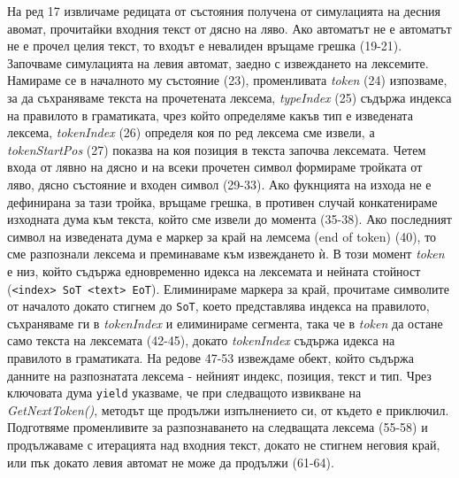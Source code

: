 \documentclass[12pt, oneside]{article}
\theoremstyle{definition}
\begin{document}
На ред 17 извличаме редицата от състояния получена от симулацията на десния авомат, прочитайки входния текст от дясно на ляво. Ако автоматът не е автоматът не е прочел целия текст, то входът е невалиден връщаме грешка (19-21). Започваме симулацията на левия автомат, заедно с извеждането на лексемите. Намираме се в началното му състояние (23), променливата \emph{token} (24) изпозваме, за да съхраняваме текста на прочетената лексема, \emph{typeIndex} (25) съдържа индекса на правилото в граматиката, чрез който определяме какъв тип е изведената лексема, \emph{tokenIndex} (26) определя коя по ред лексема сме извели, а \emph{tokenStartPos} (27) показва на коя позиция в текста започва лексемата. Четем входа от лявно на дясно и на всеки прочетен символ формираме тройката от ляво, дясно състояние и входен символ (29-33). Ако фукнцията на изхода не е дефинирана за тази тройка, връщаме грешка, в противен случай конкатенираме изходната дума към текста, който сме извели до момента (35-38). Ако последният символ на изведената дума е маркер за край на лемсема (end of token) (40), то сме разпознали лексема и преминаваме към извеждането ѝ. В този момент \emph{token} е низ, който съдържа едновременно идекса на лексемата и нейната стойност (\verb/<index> SoT <text> EoT/). Елиминираме маркера за край, прочитаме символите от началото докато стигнем до \verb/SoT/, което представлява индекса на правилото, съхраняваме ги в \emph{tokenIndex} и елиминираме сегмента, така че в \emph{token} да остане само текста на лексемата (42-45), докато \emph{tokenIndex} съдържа идекса на правилото в граматиката.  На редове 47-53 извеждаме обект, който съдържа данните на разпознатата лексема - нейният индекс, позиция, текст и тип. Чрез ключовата дума \verb/yield/ указваме, че при следващото извикване на \emph{GetNextToken()}, методът ще продължи изпълнението си, от където е приключил. Подготвяме променливите за разпознаването на следващата лексема (55-58) и продължаваме с итерацията над входния текст, докато не стигнем неговия край, или пък докато левия автомат не може да продължи (61-64).
\end{document}
